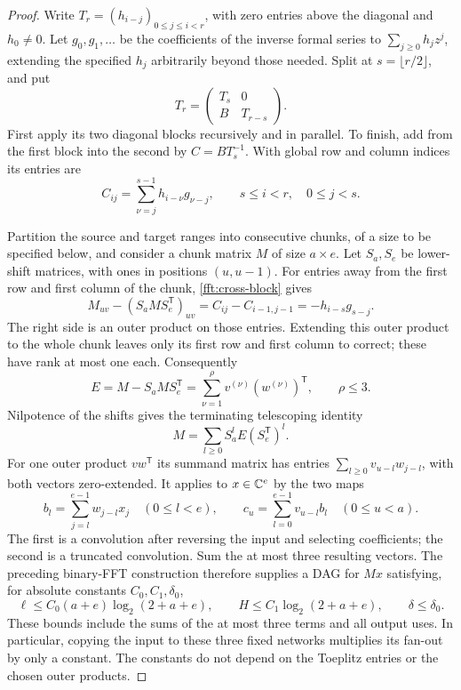 \begin{proof}
Write $T_r=(h_{i-j})_{0\le j\le i<r}$, with zero entries above the
diagonal and $h_0\ne0$.  Let $g_0,g_1,\ldots$ be the coefficients of
the inverse formal series to $\sum_{j\ge0}h_jz^j$, extending the
specified $h_j$ arbitrarily beyond those needed.  Split at
$s=\lfloor r/2\rfloor$, and put
\[
 T_r=\begin{pmatrix}T_s&0\\ B&T_{r-s}\end{pmatrix}.
\]
First apply its two diagonal blocks recursively and in parallel.  To
finish, add from the first block into the second by $C=BT_s^{-1}$.
With global row and column indices its entries are
\begin{equation}\label{fft:cross-block}
 C_{ij}=\sum_{\nu=j}^{s-1}h_{i-\nu}g_{\nu-j},
 \qquad s\le i<r,\quad 0\le j<s.
\end{equation}

Partition the source and target ranges into consecutive chunks, of a
size to be specified below, and consider a chunk matrix $M$ of size
$a\times e$.  Let $S_a,S_e$ be lower-shift matrices, with ones in
positions $(u,u-1)$.  For entries away from the first row and first
column of the chunk, \cref{fft:cross-block} gives
\[
 M_{uv}-(S_aMS_e^{\mathsf T})_{uv}
 =C_{ij}-C_{i-1,j-1}=-h_{i-s}g_{s-j}.
\]
The right side is an outer product on those entries.  Extending this
outer product to the whole chunk leaves only its first row and first
column to correct; these have rank at most one each.  Consequently
\begin{equation}\label{fft:displacement}
 E=M-S_aMS_e^{\mathsf T}
   =\sum_{\nu=1}^{\rho}v^{(\nu)}(w^{(\nu)})^{\mathsf T},
 \qquad \rho\le3.
\end{equation}
Nilpotence of the shifts gives the terminating telescoping identity
\[
 M=\sum_{l\ge0}S_a^lE(S_e^{\mathsf T})^l.
\]
For one outer product $vw^{\mathsf T}$ its summand matrix has entries
$\sum_{l\ge0}v_{u-l}w_{j-l}$, with both vectors zero-extended.
It applies to $x\in\mathbb C^e$ by the two maps
\begin{equation}\label{fft:two-convolutions}
 b_l=\sum_{j=l}^{e-1}w_{j-l}x_j\quad(0\le l<e),
 \qquad
 c_u=\sum_{l=0}^{e-1}v_{u-l}b_l\quad(0\le u<a).
\end{equation}
The first is a convolution after reversing the input and selecting
coefficients; the second is a truncated convolution.  Sum the at most
three resulting vectors.  The preceding binary-FFT construction
therefore supplies a DAG for $Mx$ satisfying, for absolute constants
$C_0,C_1,\delta_0$,
\begin{equation}\label{fft:chunk-dag}
 \ell\le C_0(a+e)\log_2(2+a+e),\qquad
 H\le C_1\log_2(2+a+e),\qquad
 \delta\le\delta_0.
\end{equation}
These bounds include the sums of the at most three terms and all
output uses.  In particular, copying the input to these three fixed
networks multiplies its fan-out by only a constant.  The constants do
not depend on the Toeplitz entries or the chosen outer products.


\end{proof}
